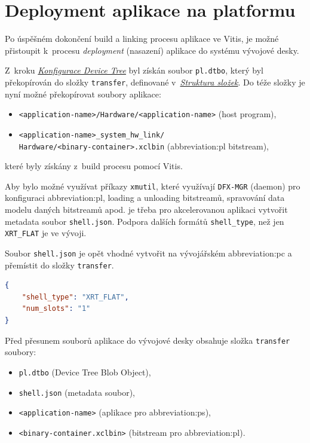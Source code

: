\documentclass[a4paper, twoside, 11pt]{article}
\begin{document}
		

	
	\section{Deployment aplikace na platformu}
	Po úspěšném dokončení build a linking procesu aplikace ve Vitis, je možné přistoupit k~procesu \textit{deployment} (nasazení) aplikace do systému vývojové desky.\par
	Z~kroku \hyperref[subsubsec:konfigurace-device-tree]{\textit{Konfigurace Device Tree}} byl získán soubor \texttt{pl.dtbo}, který byl překopírován do složky \texttt{transfer}, definované v~\hyperref[sec:struktura-slozek]{\textit{Struktura složek}}. Do téže složky je nyní možné překopírovat soubory aplikace:
	\begin{itemize}
		\item \texttt{<application-name>/Hardware/<application-name>} (host program),
		\item \texttt{<application-name>\_system\_hw\_link/\\Hardware/<binary-container>.xclbin} (\gls{abbreviation:pl} bitstream),
	\end{itemize}
	které byly získány z~build procesu pomocí Vitis.\par
	Aby bylo možné využívat příkazy \texttt{xmutil}, které využívají \texttt{DFX-MGR} (daemon) \cite{xilinx-github-dfx-mgr} pro konfiguraci \gls{abbreviation:pl}, loading a unloading bitstreamů, spravování data modelu daných bitstreamů apod. je třeba pro akcelerovanou aplikaci vytvořit metadata soubor \texttt{shell.json}. Podpora dalších formátů \texttt{shell\_type}, než jen \texttt{XRT\_FLAT} je ve vývoji. \cite{xilinx-github-vitis-tutorials-step-2-create-the-software-components}\par
	Soubor \texttt{shell.json} je opět vhodné vytvořit na vývojářském \gls{abbreviation:pc} a přemístit do složky \texttt{transfer}.\par

	\begin{lstlisting}[language={json}, caption={Metadata shell.json soubor pro xmutil.}, label={lst:metadata-shell-json}]
{
	"shell_type": "XRT_FLAT",
	"num_slots": "1"
}\end{lstlisting}
	
	\vspace*{0.35cm}
	Před přesunem souborů aplikace do vývojové desky obsahuje složka \texttt{transfer} soubory:
	\begin{itemize}
		\item \texttt{pl.dtbo} (Device Tree Blob Object),
		\item \texttt{shell.json} (metadata soubor),
		\item \texttt{<application-name>} (aplikace pro \gls{abbreviation:ps}),
		\item \texttt{<binary-container.xclbin>} (bitstream pro \gls{abbreviation:pl}). 
	\end{itemize}
	\vspace*{0.75cm}
\end{document}
